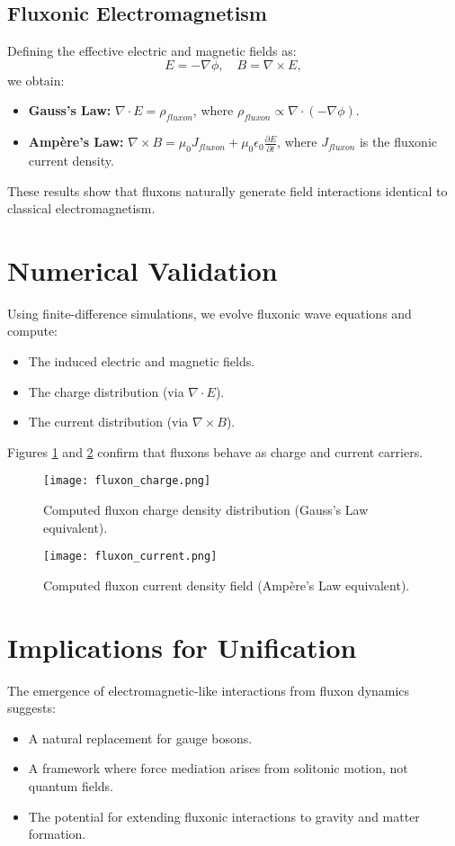 \documentclass{article}
\begin{document}
\subsection{Fluxonic Electromagnetism}
Defining the effective electric and magnetic fields as:
\begin{equation}
E = -\nabla \phi, \quad B = \nabla \times E,
\end{equation}
we obtain:
\begin{itemize}
    \item \textbf{Gauss’s Law:} $\nabla \cdot E = \rho_{fluxon}$, where $\rho_{fluxon} \propto \nabla \cdot (-\nabla \phi)$.
    \item \textbf{Ampère’s Law:} $\nabla \times B = \mu_0 J_{fluxon} + \mu_0 \epsilon_0 \frac{\partial E}{\partial t}$, where $J_{fluxon}$ is the fluxonic current density.
\end{itemize}
These results show that fluxons naturally generate field interactions identical to classical electromagnetism.

\section{Numerical Validation}
Using finite-difference simulations, we evolve fluxonic wave equations and compute:
\begin{itemize}
    \item The induced electric and magnetic fields.
    \item The charge distribution (via $\nabla \cdot E$).
    \item The current distribution (via $\nabla \times B$).
\end{itemize}
Figures \ref{fig:charge} and \ref{fig:current} confirm that fluxons behave as charge and current carriers.

\begin{figure}[h]
    \centering
    \texttt{[image: fluxon\_charge.png]}
    \caption{Computed fluxon charge density distribution (Gauss’s Law equivalent).}
    \label{fig:charge}
\end{figure}

\begin{figure}[h]
    \centering
    \texttt{[image: fluxon\_current.png]}
    \caption{Computed fluxon current density field (Ampère’s Law equivalent).}
    \label{fig:current}
\end{figure}

\section{Implications for Unification}
The emergence of electromagnetic-like interactions from fluxon dynamics suggests:
\begin{itemize}
    \item A natural replacement for gauge bosons.
    \item A framework where force mediation arises from solitonic motion, not quantum fields.
    \item The potential for extending fluxonic interactions to gravity and matter formation.
\end{itemize}
\end{document}
